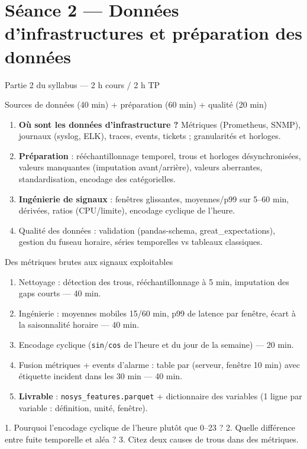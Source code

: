 \documentclass[11pt,a4paper]{article}
\begin{document}
\section*{Séance 2 — Données d'infrastructures et préparation des données}
\begin{seancebox}{Partie 2 du syllabus — 2 h cours / 2 h TP}
\end{seancebox}
\begin{coursbox}{Sources de données (40 min) + préparation (60 min) + qualité (20 min)}
\begin{enumerate}[nosep]
\item \textbf{Où sont les données d'infrastructure ?} Métriques (Prometheus, SNMP), journaux (syslog, ELK), traces, events, tickets ; granularités et horloges.
\item \textbf{Préparation} : rééchantillonnage temporel, trous et horloges désynchronisées, valeurs manquantes (imputation avant/arrière), valeurs aberrantes, standardisation, encodage des catégorielles.
\item \textbf{Ingénierie de signaux} : fenêtres glissantes, moyennes/p99 sur 5--60 min, dérivées, ratios (CPU/limite), encodage cyclique de l'heure.
\item Qualité des données : validation (pandas-schema, great\_expectations), gestion du fuseau horaire, séries temporelles vs tableaux classiques.
\end{enumerate}
\end{coursbox}
\begin{tpbox}{Des métriques brutes aux signaux exploitables}
\begin{enumerate}[nosep]
\item Nettoyage : détection des trous, rééchantillonnage à 5 min, imputation des gaps courts — 40 min.
\item Ingénierie : moyennes mobiles 15/60 min, p99 de latence par fenêtre, écart à la saisonnalité horaire — 40 min.
\item Encodage cyclique (\texttt{sin}/\texttt{cos} de l'heure et du jour de la semaine) — 20 min.
\item Fusion métriques + events d'alarme : table par (serveur, fenêtre 10 min) avec étiquette \og incident dans les 30 min \fg{} — 40 min.
\item \textbf{Livrable} : \texttt{nosys\_features.parquet} + dictionnaire des variables (1 ligne par variable : définition, unité, fenêtre).
\end{enumerate}
\end{tpbox}
\begin{evalbox}
1. Pourquoi l'encodage cyclique de l'heure plutôt que 0--23 ? 2. Quelle différence entre fuite temporelle et aléa ? 3. Citez deux causes de trous dans des métriques.
\end{evalbox}
\end{document}
